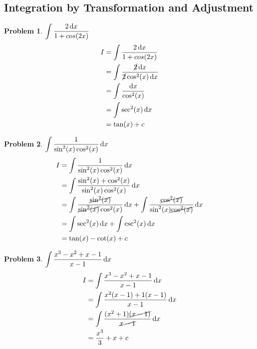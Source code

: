 \documentclass[14]{article}
\theoremstyle{definition}
\newtheorem{prob}{Problem}
\theoremstyle{case}
\begin{document}
\subsection{Integration by Transformation and Adjustment}
\begin{prob}
$\displaystyle\int \dfrac{2 \dif x}{1+ cos(2x)}$
\begin{align*}
I &= \int \dfrac{2 \dif x}{1+ cos(2x)}\\
&= \int \dfrac{\cancel{2}\dif x}{\cancel{2}\cos^2(x) \dif x}\\
&= \int \dfrac{\dif x}{\cos^2(x)}\\
&= \int \sec^2(x) \dif x\\
&= \tan(x) + c
\end{align*}
\end{prob}
\begin{prob}
$\displaystyle\int \dfrac{1}{\sin^2(x) \cos^2(x)} \dif x$
\begin{align*}
I &= \int \dfrac{1}{\sin^2(x) \cos^2(x)} \dif x\\
&= \int \dfrac{\sin^2(x) + \cos^2(x)}{\sin^2(x) \cos^2(x)} \dif x\\
&= \int \dfrac{\cancel{\sin^2(x)}}{\cancel{\sin^2(x)} \cos^2(x)} \dif x + \int \dfrac{\cancel{\cos^2(x)}}{\sin^2(x) \cancel{\cos^2(x)}} \dif x\\
&= \int \sec^2(x) \dif x + \int \csc^2(x) \dif x\\
&= \tan(x) - \cot(x) + c
\end{align*}
\end{prob}
\begin{prob}
$\displaystyle\int \dfrac{x^3 - x^2 + x - 1}{x - 1} \dif x$
\begin{align*}
I &= \int \dfrac{x^3 - x^2 + x - 1}{x - 1} \dif x\\
&= \int \dfrac{x^2 (x-1) + 1(x-1)}{x-1} \dif x\\
&= \int \dfrac{(x^2 + 1)\cancel{(x - 1)}}{\cancel{x-1}} \dif x\\
&= \dfrac{x^3}3 + x + c
\end{align*}
\end{prob}
\pagebreak
\end{document}
